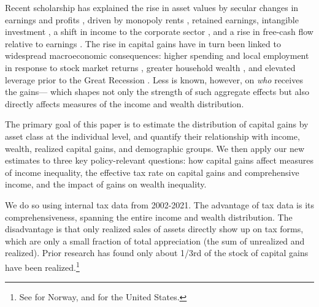 \documentclass[12pt]{article}
\begin{document}
Recent scholarship has explained the rise in asset values by secular changes in earnings and profits \citep{atkeson2025reconciling}, driven by monopoly rents \citep{eeckhout2024value,eggertsson2018kaldor}, retained earnings, intangible investment \citep{corrado2022intangible}, a shift in income to the corporate sector \citep{greenwald2025wealth}, and a rise in free-cash flow relative to earnings \citep{atkeson2026macroeconomic}. The rise in capital gains have in turn been linked to widespread macroeconomic consequences: higher spending and local employment in response to stock market returns \citep{chodorow2021stock}, greater household wealth \citep{saez2016wealth}, and elevated leverage prior to the Great Recession \citep{mian2022house}. Less is known, however, on \textit{who} receives the gains--- which shapes not only the strength of such aggregate effects but also directly affects measures of the income and wealth distribution.  


The primary goal of this paper is to estimate the distribution of capital gains by asset class at the individual level, and quantify their relationship with income, wealth, realized capital gains, and demographic groups. We then apply our new estimates to three key policy-relevant questions: how capital gains affect measures of income inequality, the effective tax rate on capital gains and comprehensive income, and the impact of gains on wealth inequality. 


We do so using internal tax data from 2002-2021. The advantage of tax data is its comprehensiveness, spanning the entire income and wealth distribution. The disadvantage is that only realized sales of assets directly show up on tax forms, which are only a small fraction of total appreciation (the sum of unrealized and realized). Prior research has found only about 1/3rd of the stock of capital gains have been realized.\footnote{See \citet{msall2025never} for Norway, \citet{fox2025role} and \citet{sabelhaus2025taxing} for the United States.}
\end{document}
